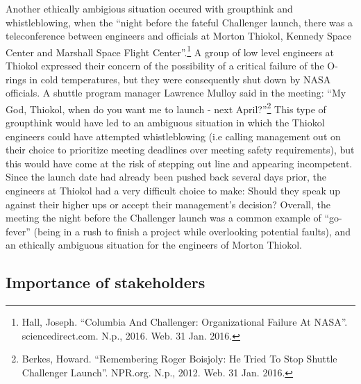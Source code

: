 \documentclass{article}
\newcommand{\q}[1]{``#1''}
\begin{document}
Another ethically ambigious situation occured with groupthink and whistleblowing, when the \q{night before the fateful Challenger launch, there was a teleconference between engineers and officials at Morton Thiokol, Kennedy Space Center and Marshall Space Flight Center}.\footnote{Hall, Joseph. \q{Columbia And Challenger: Organizational Failure At NASA}. sciencedirect.com. N.p., 2016. Web. 31 Jan. 2016.} A group of low level engineers at Thiokol expressed their concern of the possibility of a critical failure of the O-rings in cold temperatures, but they were consequently shut down by NASA officials. A shuttle program manager Lawrence Mulloy said in the meeting: \q{My God, Thiokol, when do you want me to launch - next April?}\footnote{Berkes, Howard. \q{Remembering Roger Boisjoly:  He Tried To Stop Shuttle Challenger Launch}. NPR.org. N.p., 2012. Web. 31 Jan. 2016.} This type of groupthink would have led to an ambiguous situation in which the Thiokol engineers could have attempted whistleblowing (i.e calling management out on their choice to prioritize meeting deadlines over meeting safety requirements), but this would have come at the risk of stepping out line and appearing incompetent. Since the launch date had already been pushed back several days prior, the engineers at Thiokol had a very difficult choice to make: Should they speak up against their higher ups or accept their management's decision? Overall, the meeting the night before the Challenger launch was a common example of \q{go-fever} (being in a rush to finish a project while overlooking potential faults), and an ethically ambiguous situation for the engineers of Morton Thiokol.
\par

\subsection{Importance of stakeholders}
\end{document}
